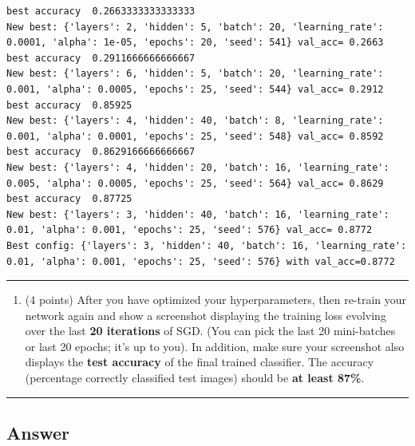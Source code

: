 \documentclass[
  letterpaper,
  DIV=11,
  numbers=noendperiod]{scrartcl}
\providecommand{\tightlist}{%
  \setlength{\itemsep}{0pt}\setlength{\parskip}{0pt}}\usepackage{longtable,booktabs,array}
\begin{document}
\label{prob2_2}
\begin{verbatim}
best accuracy  0.2663333333333333
New best: {'layers': 2, 'hidden': 5, 'batch': 20, 'learning_rate': 0.0001, 'alpha': 1e-05, 'epochs': 20, 'seed': 541} val_acc= 0.2663
best accuracy  0.2911666666666667
New best: {'layers': 6, 'hidden': 5, 'batch': 20, 'learning_rate': 0.001, 'alpha': 0.0005, 'epochs': 25, 'seed': 544} val_acc= 0.2912
best accuracy  0.85925
New best: {'layers': 4, 'hidden': 40, 'batch': 8, 'learning_rate': 0.001, 'alpha': 0.0001, 'epochs': 25, 'seed': 548} val_acc= 0.8592
best accuracy  0.8629166666666667
New best: {'layers': 4, 'hidden': 20, 'batch': 16, 'learning_rate': 0.005, 'alpha': 0.0005, 'epochs': 25, 'seed': 564} val_acc= 0.8629
best accuracy  0.87725
New best: {'layers': 3, 'hidden': 40, 'batch': 16, 'learning_rate': 0.01, 'alpha': 0.001, 'epochs': 25, 'seed': 576} val_acc= 0.8772
Best config: {'layers': 3, 'hidden': 40, 'batch': 16, 'learning_rate': 0.01, 'alpha': 0.001, 'epochs': 25, 'seed': 576} with val_acc=0.8772
\end{verbatim}

\begin{center}\rule{0.5\linewidth}{0.5pt}\end{center}

\begin{enumerate}
\def\labelenumi{\arabic{enumi}.}
\setcounter{enumi}{2}
\tightlist
\item
  (4 points) After you have optimized your hyperparameters, then
  re-train your network again and show a screenshot displaying the
  training loss evolving over the last \textbf{20 iterations} of SGD.
  (You can pick the last 20 mini-batches or last 20 epochs; it's up to
  you). In addition, make sure your screenshot also displays the
  \textbf{test accuracy} of the final trained classifier. The accuracy
  (percentage correctly classified test images) should be \textbf{at
  least 87\%}.
\end{enumerate}

\begin{center}\rule{0.5\linewidth}{0.5pt}\end{center}

\subsection{Answer}\label{answer-5}
\end{document}

